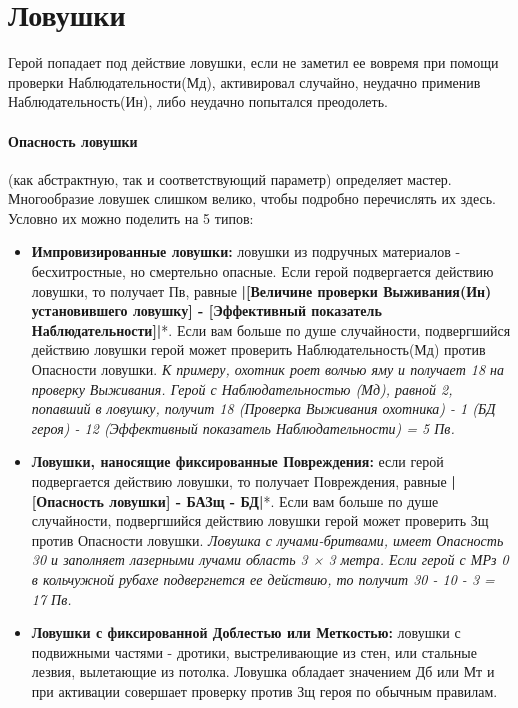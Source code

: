 \section{Ловушки}
Герой попадает под действие ловушки, если не заметил ее вовремя при помощи проверки Наблюдательности(Мд), активировал случайно, неудачно применив Наблюдательность(Ин), либо неудачно попытался преодолеть. 
\paragraph{Опасность ловушки} (как абстрактную, так и соответствующий параметр) определяет мастер. Многообразие ловушек слишком велико, чтобы подробно перечислять их здесь. Условно их можно поделить на 5 типов:
\begin{itemize}
  \item \textbf{Импровизированные ловушки:} ловушки из подручных материалов - бесхитростные, но смертельно опасные. Если герой подвергается действию ловушки, то получает Пв, равные \textbf{|[Величине проверки Выживания(Ин) установившего ловушку] - [Эффективный показатель Наблюдательности]|}*. 
    \newline *Если вам больше по душе случайности, подвергшийся действию ловушки герой может проверить Наблюдательность(Мд) против Опасности ловушки.
    \newline \textit{К примеру, охотник роет волчью яму и получает 18 на проверку Выживания. Герой с Наблюдательностью (Мд), равной 2, попавший в ловушку, получит 18 (Проверка Выживания охотника) - 1 (БД героя) - 12 (Эффективный показатель Наблюдательности) = 5 Пв.}
  \item \textbf{Ловушки, наносящие фиксированные Повреждения:} если герой подвергается действию ловушки, то получает Повреждения, равные \textbf{|[Опасность ловушки] - БАЗщ - БД|}*. 
    \newline *Если вам больше по душе случайности, подвергшийся действию ловушки герой может проверить Зщ против Опасности ловушки. 
    \newline \textit{Ловушка с лучами-бритвами, имеет Опасность 30 и заполняет лазерными лучами область 3 × 3 метра. Если герой с МРз 0 в кольчужной рубахе подвергнется ее действию, то получит 30 - 10 - 3 = 17 Пв.}
  \item \textbf{Ловушки с фиксированной Доблестью или Меткостью:} ловушки с подвижными частями - дротики, выстреливающие из стен, или стальные лезвия, вылетающие из потолка. Ловушка обладает значением Дб или Мт и при активации совершает проверку против Зщ героя по обычным правилам.

\end{itemize}
